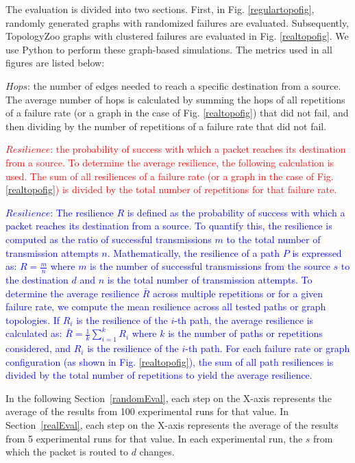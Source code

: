 \documentclass[conference]{IEEEtran}
\begin{document}
The evaluation is divided into two sections. First, in Fig. \ref{regulartopofig}, randomly generated graphs with randomized failures are evaluated. Subsequently, TopologyZoo \cite{topologyZoo} graphs with clustered failures are evaluated in Fig. \ref{realtopofig}.
We use Python to perform these graph-based simulations.
The metrics used in all figures are listed below:

$Hops$: the number of edges needed to reach a specific destination from a source. The average number of hops is calculated by summing the hops of all repetitions of a failure rate (or a graph in the case of Fig. \ref{realtopofig}) that did not fail, and then dividing by the number of repetitions of a failure rate that did not fail.

\textcolor{red}{$Resilience$: the probability of success with which a packet reaches its destination from a source. To determine the average resilience, the following calculation is used. The sum of all resiliences of a failure rate (or a graph in the case of Fig. \ref{realtopofig}) is divided by the total number of repetitions for that failure rate.}

\textcolor{blue}{$Resilience$: The resilience $R$ is defined as the probability of success with which a packet reaches its destination from a source. To quantify this, the resilience is computed as the ratio of successful transmissions $m$ to the total number of transmission attempts $n$. Mathematically, the resilience of a path $P$ is expressed as: $R = \frac{m}{n}$ where $m$ is the number of successful transmissions from the source $s$ to the destination $d$ and $n$ is the total number of transmission attempts.
To determine the average resilience $\bar{R}$ across multiple repetitions or for a given failure rate, we compute the mean resilience across all tested paths or graph topologies. If  $R_i$  is the resilience of the $i$-th path, the average resilience is calculated as: $\bar{R} = \frac{1}{k} \sum_{i=1}^{k} R_i$
where $k$ is the number of paths or repetitions considered, and $R_i$ is the resilience of the $i$-th path. For each failure rate or graph configuration (as shown in Fig. \ref{realtopofig}), the sum of all path resiliences is divided by the total number of repetitions to yield the average resilience.
}

In the following Section~\ref{randomEval}, each step on the X-axis represents the average of the results from 100 experimental runs for that value. In Section~\ref{realEval}, each step on the X-axis represents the average of the results from 5 experimental runs for that value. In each experimental run, the $s$ from which the packet is routed to $d$ changes. 
\end{document}
